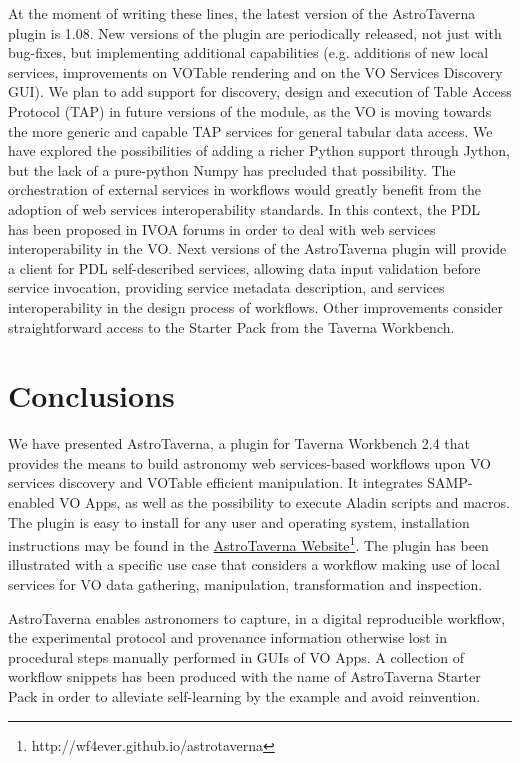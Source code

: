 \documentclass{aa}
\begin{document}
At the moment of writing these lines, the latest version of the AstroTaverna plugin is 1.08. New versions of the plugin are periodically released, not just with bug-fixes, but implementing additional capabilities (e.g. additions of new local services, improvements on VOTable rendering and on the VO Services Discovery GUI). We plan to add support for discovery, design and execution of Table Access Protocol (TAP) in future versions of the module, as the VO is moving towards the more generic and capable TAP services for general tabular data access. We have explored the possibilities of adding a richer Python support through Jython, but the lack of a pure-python Numpy has precluded that possibility. The orchestration of external services in workflows would greatly benefit from the adoption of web services interoperability standards. In this context, the PDL~\citep[Parameter Description Language;][]{Zwolf2013} has been proposed in IVOA forums in order to deal with web services interoperability in the VO. Next versions of the AstroTaverna plugin will provide a client for PDL self-described services, allowing data input validation before service invocation, providing service metadata description, and services interoperability in the design process of workflows. Other improvements consider  straightforward access to the Starter Pack from the Taverna Workbench. 

\section{Conclusions}
\label{Conclusions}

We have presented AstroTaverna, a plugin for Taverna Workbench 2.4 that provides the means to build astronomy web services-based workflows upon VO services discovery and VOTable efficient manipulation. It integrates SAMP-enabled VO Apps, as well as the possibility to execute Aladin scripts and macros. The plugin is easy to install for any user and operating system, installation instructions may be found in the \href{http://wf4ever.github.io/astrotaverna}{AstroTaverna Website}\footnote{http://wf4ever.github.io/astrotaverna}. The plugin has been illustrated with a specific use case that considers a workflow making use of local services for VO data gathering, manipulation, transformation and inspection.

AstroTaverna  enables astronomers to capture, in a digital reproducible workflow, the experimental protocol and provenance information otherwise lost in procedural steps manually performed in GUIs of VO Apps. A collection of workflow snippets has been produced with the name of AstroTaverna Starter Pack in order to alleviate self-learning by the example and avoid reinvention.
\end{document}
